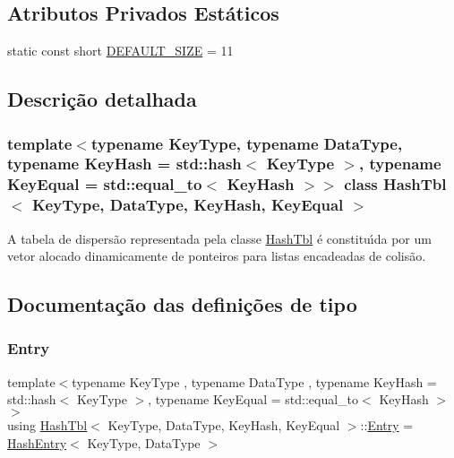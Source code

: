 \subsection*{Atributos Privados Estáticos}
\begin{DoxyCompactItemize}
\item 
static const short \hyperlink{classHashTbl_aeffa5b1a163fb6a09a18fd254a4d6dcf}{D\+E\+F\+A\+U\+L\+T\+\_\+\+S\+I\+ZE} = 11
\end{DoxyCompactItemize}


\subsection{Descrição detalhada}
\subsubsection*{template$<$typename Key\+Type, typename Data\+Type, typename Key\+Hash = std\+::hash$<$ Key\+Type $>$, typename Key\+Equal = std\+::equal\+\_\+to$<$ Key\+Hash $>$$>$\newline
class Hash\+Tbl$<$ Key\+Type, Data\+Type, Key\+Hash, Key\+Equal $>$}

A tabela de dispersão representada pela classe \hyperlink{classHashTbl}{Hash\+Tbl} é constituı́da por um vetor alocado dinamicamente de ponteiros para listas encadeadas de colisão. 

\subsection{Documentação das definições de tipo}
\mbox{\label{classHashTbl_ab9ca4e5818aa21557c7cedaf02a1e7db}} 
\subsubsection{\texorpdfstring{Entry}{Entry}}
{\footnotesize\ttfamily template$<$typename Key\+Type , typename Data\+Type , typename Key\+Hash  = std\+::hash$<$ Key\+Type $>$, typename Key\+Equal  = std\+::equal\+\_\+to$<$ Key\+Hash $>$$>$ \\
using \hyperlink{classHashTbl}{Hash\+Tbl}$<$ Key\+Type, Data\+Type, Key\+Hash, Key\+Equal $>$\+::\hyperlink{classHashTbl_ab9ca4e5818aa21557c7cedaf02a1e7db}{Entry} =  \hyperlink{classHashEntry}{Hash\+Entry}$<$ Key\+Type, Data\+Type $>$}



